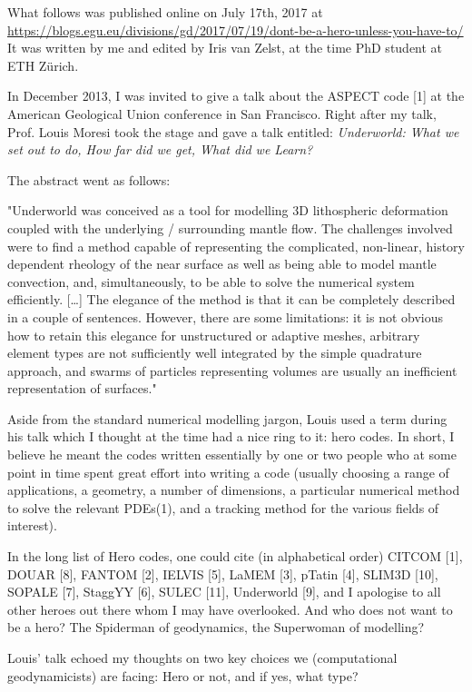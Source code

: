 What follows was published online on July 17th, 2017 at 
\url{https://blogs.egu.eu/divisions/gd/2017/07/19/dont-be-a-hero-unless-you-have-to/}
It was written by me and edited by Iris van Zelst, at the time PhD student at ETH Z\"urich.

\vspace{3mm}

In December 2013, I was invited to give a talk about the ASPECT code [1] 
at the American Geological Union conference in San Francisco. Right 
after my talk, Prof. Louis Moresi took the stage and gave a talk entitled: 
{\it Underworld: What we set out to do, How far did we get, What did we Learn?}

The abstract went as follows:

"Underworld was conceived as a tool for modelling 3D lithospheric deformation coupled with the underlying / surrounding mantle flow. The challenges involved were to find a method capable of representing the complicated, non-linear, history dependent rheology of the near surface as well as being able to model mantle convection, and, simultaneously, to be able to solve the numerical system efficiently. […] The elegance of the method is that it can be completely described in a couple of sentences. However, there are some limitations: it is not obvious how to retain this elegance for unstructured or adaptive meshes, arbitrary element types are not sufficiently well integrated by the simple quadrature approach, and swarms of particles representing volumes are usually an inefficient representation of surfaces."

Aside from the standard numerical modelling jargon, Louis used a term during his talk which I thought at the time had a nice ring to it: hero codes. In short, I believe he meant the codes written essentially by one or two people who at some point in time spent great effort into writing a code (usually choosing a range of applications, a geometry, a number of dimensions, a particular numerical method to solve the relevant PDEs(1), and a tracking method for the various fields of interest).

In the long list of Hero codes, one could cite (in alphabetical order) CITCOM [1], DOUAR [8], FANTOM [2], IELVIS [5], LaMEM [3], pTatin [4], SLIM3D [10], SOPALE [7], StaggYY [6], SULEC [11], Underworld [9], and I apologise to all other heroes out there whom I may have overlooked. And who does not want to be a hero? The Spiderman of geodynamics, the Superwoman of modelling?

Louis' talk echoed my thoughts on two key choices we (computational geodynamicists) are facing: Hero or not, and if yes, what type?

